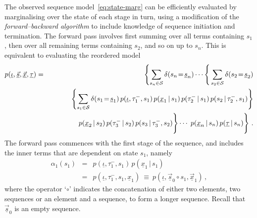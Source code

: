 \documentclass[a4paper]{article}
\begin{document}
The observed sequence model~\eqref{eq:state-marg} can be efficiently evaluated by marginalising over the state of each stage
in turn, using a modification of the {\em forward--backward algorithm} to include knowledge of
sequence initiation and termination.
 The forward pass involves first summing over all terms containing $s_1$, then over all remaining terms containing $s_2$,
and so on up to $s_n$. This is equivalent to evaluating the reordered model
\begin{eqnarray}
   p(\underline{\iota},\underline{\vec{s}},\underline{\vec{x}},\underline{\tau}) 
& = & 
   \left\{\sum_{s_n\in{\cal S}}\delta(s_n\!=\!\underline{s}_n)
\cdots
\right\{\sum_{s_2\in{\cal S}}\delta(s_2\!=\!\underline{s}_2)
\nonumber\\&&
\hspace*{10mm}{}
\left\{\sum_{s_1\in{\cal S}}\delta(s_1\!=\!\underline{s}_1)\,
p(\underline{\iota},\tau^-_1,s_1)\,p(\underline{x}_1\,|\,s_1)\,p(\tau^-_2\,|\,s_1)\,p(s_2\,|\,\tau^-_2,s_1)\right\}
\nonumber\\&&
\left.\rule{0pt}{6mm}
p(\underline{x}_{2}\,|\,s_2)\,p(\tau^-_3\,|\,s_2)\,p(s_3\,|\,\tau^-_3,s_2)\right\}
\cdots
\left.\rule{0pt}{6mm}\,p(\underline{x}_{n}\,|\,s_n)
\,p(\underline{\tau}\,|\,s_n)\right\}
\,.
\label{eq:forward}
\end{eqnarray}
 The forward pass commences with the first stage of the sequence, and includes the inner terms that are dependent on state $s_1$, namely
\begin{eqnarray}
  \alpha_1(s_1) & = & p(\underline{\iota},\tau^-_1,s_1)\,p(\underline{x}_1\,|\,s_1)
\nonumber\\&=&
p(\underline{\iota},\tau^-_1,s_1,\underline{x}_1)~\equiv~p(\underline{\iota},\underline{\vec{s}}_0\circ s_1,\underline{\vec{x}}_1)\,,
\label{eq:alpha_1}
\end{eqnarray}
where the operator `$\circ$' indicates the concatenation of either two elements, two sequences or an element and a sequence, to form a longer sequence.
Recall that $\underline{\vec{s}}_0$ is an empty sequence.
\end{document}
